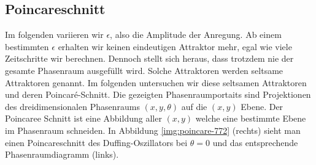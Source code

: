 \documentclass[12pt,a4paper]{article}
\begin{document}
\subsection{ Poincareschnitt }
Im folgenden variieren wir $\epsilon$, also die Amplitude der Anregung.
Ab einem bestimmten $\epsilon$ erhalten wir keinen eindeutigen Attraktor mehr, egal wie viele Zeitschritte wir berechnen. Dennoch stellt sich heraus, dass trotzdem nie der gesamte Phasenraum ausgefüllt wird. Solche Attraktoren werden seltsame Attraktoren genannt. Im folgenden untersuchen wir diese seltsamen Attraktoren und deren Poincaré-Schnitt. 
Die gezeigten Phasenraumportaits sind Projektionen des dreidimensionalen Phasenraums $(x,y,\theta)$ auf die $(x,y)$ Ebene. Der Poincaree Schnitt ist eine Abbildung aller $(x,y)$ welche eine bestimmte Ebene im Phasenraum schneiden. In Abbildung \ref{img:poincare-772} (rechts) sieht man einen Poincareschnitt des Duffing-Oszillators bei $\theta=0$ und das entsprechende Phasenraumdiagramm (links).
\end{document}
